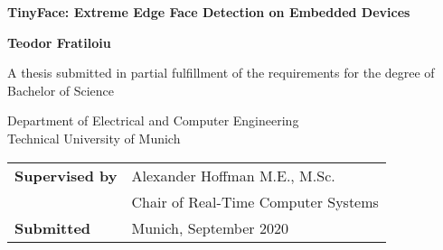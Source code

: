   \begin{center}
        \vspace*{1cm}
        \begin{flushleft}
            \Huge
            \textbf{TinyFace: Extreme Edge Face Detection on Embedded Devices}
            
            \vspace{300 pt}
            \huge
            \textbf{Teodor Fratiloiu}
            
            \vspace{30 pt}
            
            \large
            A thesis submitted in partial fulfillment of the requirements for the degree of Bachelor of Science \\
            \vspace{30 pt}

            \Large
            Department of Electrical and Computer Engineering \\
            Technical University of Munich
            \vspace{30 pt}
            
            \large
            \begin{tabular}{ l l }
                 \textbf{Supervised by\hspace{75 pt}} & Alexander Hoffman M.E., M.Sc. \\  
                                        & Chair of Real-Time Computer Systems \\
                 \textbf{Submitted \hspace{75 pt}} & Munich, September 2020    
            \end{tabular}
         
        \end{flushleft}
   \end{center}